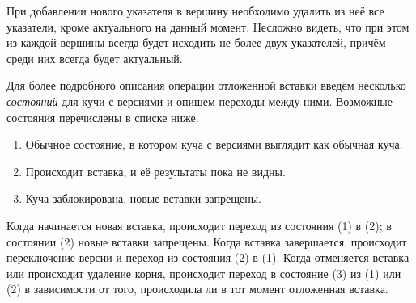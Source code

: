 При добавлении нового указателя в вершину необходимо удалить из неё все указатели,
кроме актуального на данный момент. Несложно видеть, что при этом из каждой
вершины всегда будет исходить не более двух указателей, причём среди них
всегда будет актуальный.

Для более подробного описания операции отложенной вставки введём несколько \emph{состояний}
для кучи с версиями и опишем переходы между ними. Возможные состояния
перечислены в списке ниже.
\begin{enumerate}
\item Обычное состояние, в котором куча с версиями выглядит как обычная куча.
\item Происходит вставка, и её результаты пока не видны.
\item Куча заблокирована, новые вставки запрещены.
\end{enumerate}

Когда начинается новая вставка, происходит переход из состояния (1) в (2);
в состоянии (2) новые вставки запрещены. Когда вставка завершается,
происходит переключение версии и переход из состояния (2) в (1).
Когда отменяется вставка или происходит удаление корня,
происходит переход в состояние (3) из (1) или (2) в зависимости
от того, происходила ли в тот момент отложенная вставка.
